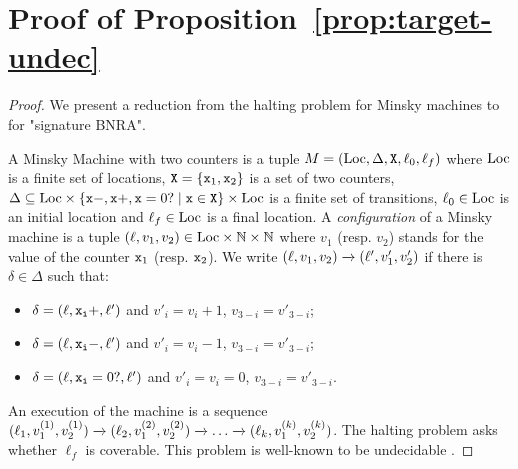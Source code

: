 \section{Proof of Proposition~\ref{prop:target-undec}}
\label{app:target}

\propTargetUndecidable*

\begin{proof}
	We present a reduction from the halting problem for Minsky machines to \COVER for "signature BNRA".
	
	A Minsky Machine with two counters is a tuple $M= (\text{Loc}, \Delta, \mathtt{X}, \ell_0, \ell_f)$ where $\text{Loc}$ is a finite set of locations, $\mathtt{X} = \{\mathtt{x}_1, \mathtt{x}_2\}$ is a set of two counters, $\Delta \subseteq \text{Loc} \times \{\mathtt{\mathtt{x}}-,\mathtt{\mathtt{x}}+,\mathtt{\mathtt{x}}=0? \mid \mathtt{x} \in \mathtt{X}\} \times \text{Loc}$ is a finite set of transitions, $\ell_0 \in \text{Loc}$ is an initial location and $\ell_f \in \text{Loc}$ is a final location. A \emph{configuration} of a Minsky machine is a tuple $(\ell, v_1, v_2) \in \text{Loc} \times \mathbb{N} \times \mathbb{N}$ where $v_1$ (resp. $v_2$) stands for the value of the counter $\mathtt{x}_1$ (resp. $\mathtt{x}_2$). 
	We write $(\ell, v_1, v_2) \xrightarrow{} (\ell', v'_1, v'_2)$ if there is $\delta \in \Delta$ such that:
	\begin{itemize}
		\item $\delta = (\ell, \mathtt{\mathtt{x}_i}+, \ell')$ and $v'_i = v_i+1$, $v_{3-i} = v'_{3-i}$;
		\item $\delta = (\ell, \mathtt{\mathtt{x}_i}-, \ell')$ and $v'_i = v_i-1$, $v_{3-i} = v'_{3-i}$;
		\item $\delta = (\ell, \mathtt{\mathtt{x}_i}=0?, \ell')$ and $v'_i = v_i = 0$, $v_{3-i} = v'_{3-i}$.
	\end{itemize}
	An execution of the machine is a sequence $(\ell_1, v_1^{(1)}, v_2^{(1)}) \xrightarrow{} (\ell_2, v_1^{(2)}, v_2^{(2)}) \xrightarrow{} \dots \xrightarrow{} (\ell_k, v_1^{(k)}, v_2^{(k)})$. 
	The halting problem asks whether $\ell_f$ is coverable. This problem is well-known to be undecidable \cite{minsky}.
	

\end{proof}
